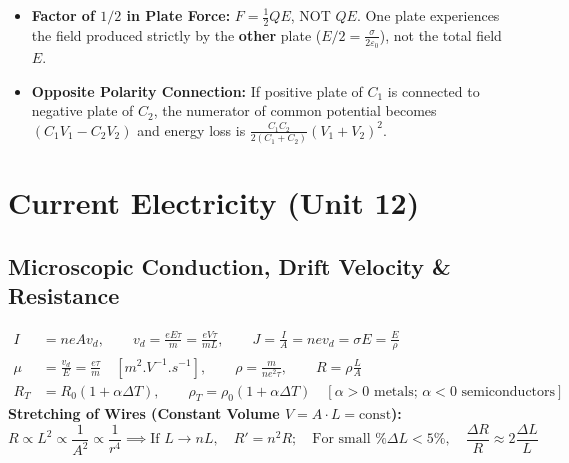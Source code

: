 \documentclass[11pt,a4paper]{article}
\begin{document}
\begin{trapbox}
\begin{itemize}
  \item \textbf{Factor of $1/2$ in Plate Force:} $F = \frac{1}{2}QE$, NOT $QE$. One plate experiences the field produced strictly by the \textbf{other} plate ($E/2 = \frac{\sigma}{2\varepsilon_0}$), not the total field $E$.
  \item \textbf{Opposite Polarity Connection:} If positive plate of $C_1$ is connected to negative plate of $C_2$, the numerator of common potential becomes $(C_1 V_1 - C_2 V_2)$ and energy loss is $\frac{C_1 C_2}{2(C_1 + C_2)}(V_1 + V_2)^2$.
\end{itemize}
\end{trapbox}

\newpage

\section{Current Electricity (Unit 12)}

\subsection{Microscopic Conduction, Drift Velocity \& Resistance}

\begin{formulabox}
\begin{align}
  I &= n e A v_d, \qquad v_d = \frac{e E \tau}{m} = \frac{e V \tau}{m L}, \qquad J = \frac{I}{A} = n e v_d = \sigma E = \frac{E}{\rho} \\
  \mu &= \frac{v_d}{E} = \frac{e\tau}{m} \quad [\si{m^2.V^{-1}.s^{-1}}], \qquad \rho = \frac{m}{n e^2 \tau}, \qquad R = \rho\frac{L}{A} \\
  R_T &= R_0(1 + \alpha\Delta T), \qquad \rho_T = \rho_0(1 + \alpha\Delta T) \quad [\alpha > 0 \text{ metals; } \alpha < 0 \text{ semiconductors}]
\end{align}
\textbf{Stretching of Wires (Constant Volume $V = A\cdot L = \text{const}$):}
\begin{equation}
  R \propto L^2 \propto \frac{1}{A^2} \propto \frac{1}{r^4} \implies \text{If } L \to nL, \quad R' = n^2 R; \quad \text{For small } \%\Delta L < 5\%, \quad \frac{\Delta R}{R} \approx 2\frac{\Delta L}{L}
\end{equation}
\end{formulabox}
\end{document}
